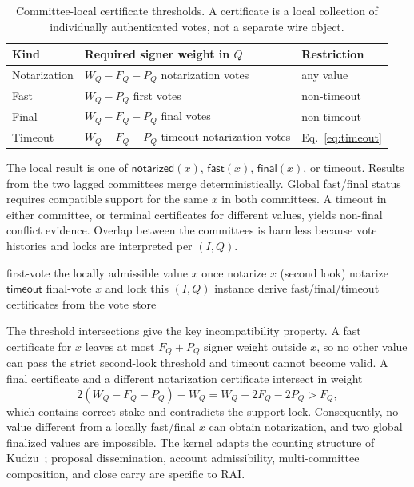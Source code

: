 \documentclass[sigplan,review,anonymous]{acmart}
\newcommand{\sys}{\textsc{RAI}\xspace}
\newcommand{\timeout}{\mathsf{timeout}}
\begin{document}
\begin{table}[t]
\caption{Committee-local certificate thresholds.  A certificate is a local collection of individually authenticated votes, not a separate wire object.}
\label{tab:thresholds}
\centering
\small
\begin{tabularx}{\columnwidth}{@{}lXl@{}}
\toprule
Kind & Required signer weight in $Q$ & Restriction \\
\midrule
Notarization & $W_Q-F_Q-P_Q$ notarization votes & any value \\
Fast & $W_Q-P_Q$ first votes & non-timeout \\
Final & $W_Q-F_Q-P_Q$ final votes & non-timeout \\
Timeout & $W_Q-F_Q-P_Q$ timeout notarization votes & Eq.~\eqref{eq:timeout} \\
\bottomrule
\end{tabularx}
\end{table}

The local result is one of $\mathsf{notarized}(x)$, $\mathsf{fast}(x)$, $\mathsf{final}(x)$, or timeout.  Results from the two lagged committees merge deterministically.  Global fast/final status requires compatible support for the same $x$ in both committees.  A timeout in either committee, or terminal certificates for different values, yields non-final conflict evidence.  Overlap between the committees is harmless because vote histories and locks are interpreted per $(I,Q)$.

\begin{algorithm}[t]
\caption{Committee-local action at validator $v$ for election $I$}
\label{alg:kernel}
\small
\begin{algorithmic}[1]
\State first-vote the locally admissible value $x$ once
  \State notarize $x$ (second look)
\EndIf
{}
  \State notarize $\timeout$
\EndIf
{}
  \State final-vote $x$ and lock this $(I,Q)$ instance
\EndIf
\State derive fast/final/timeout certificates from the vote store
\end{algorithmic}
\end{algorithm}

The threshold intersections give the key incompatibility property.  A fast certificate for $x$ leaves at most $F_Q+P_Q$ signer weight outside $x$, so no other value can pass the strict second-look threshold and timeout cannot become valid.  A final certificate and a different notarization certificate intersect in weight
\[
 2(W_Q-F_Q-P_Q)-W_Q = W_Q-2F_Q-2P_Q > F_Q,
\]
which contains correct stake and contradicts the support lock.  Consequently, no value different from a locally fast/final $x$ can obtain notarization, and two global finalized values are impossible.  The kernel adapts the counting structure of Kudzu~\cite{shoup2025kudzu}; proposal dissemination, account admissibility, multi-committee composition, and close carry are specific to \sys.
\end{document}
